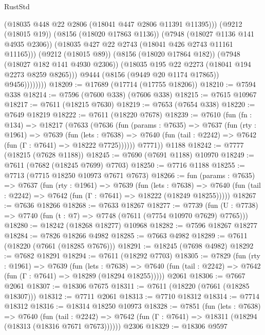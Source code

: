 \begin{lexlean}{RustStd}
\begin{coremodule}
                          (@18035 @448 @22 @2806 (@18041 @447 @2806 @11391 @11395)))
                        (@9212 (@18015 @19))
                        (@8156 (@18020 @17863 @1136))
                        (@7948 (@18027 @1136 @141 @4935 @2306))
                        (@18035 @427 @22 @2743 (@18041 @426 @2743 @11161 @11165)))
                      (@9212 (@18015 @89))
                      (@8156 (@18020 @17864 @182))
                      (@7948 (@18027 @182 @141 @4930 @2306))
                      (@18035 @195 @22 @2273 (@18041 @194 @2273 @8259 @8265)))
                    @9444
                    (@8156 (@9449 @20 @1174 @17865))
                    @9456))))))))
@18209 := @17689 (@17714 (@17755 @18206))
@18210 := @7594 @338
@18214 := @7596 (@7600 @338) (@7606 @338)
@18215 := @7615 @10967
@18217 := @7611 (@18215 @7630)
@18219 := @7653 (@7654 @338)
@18220 := @7649 @18219
@18222 := @7611 (@18220 @7678)
@18239 := @7610
    (fun (fn : @134) =>
    @18217
      (@7633
        (@7636
          (fun (params : @7635) =>
          @7637
            (fun (rty : @1961) =>
            @7639
              (fun (lets : @7638) =>
              @7640 (fun (tail : @2242) => @7642 (fun (Γ : @7641) => @18222 @7725))))))
        @7771))
    @1188
@18242 := @7777 (@18215 (@7628 @1188))
@18245 := @7690 (@7691 @1188) @10970
@18249 := @7611 (@7682 (@18245 @7699) @7703)
@18250 := @7716 @1188
@18255 := @7713 (@7715 @18250 @10973 @7671 @7673)
@18266 := fun (params : @7635) =>
  @7637
    (fun (rty : @1961) =>
    @7639
      (fun (lets : @7638) =>
      @7640 (fun (tail : @2242) => @7642 (fun (Γ : @7641) => @18222 (@18249 @18255)))))
@18267 := @7636 @18266
@18268 := @7633 @18267
@18277 := @7739
    (fun (U : @7738) => @7740 (fun (t : @7) => @7748 (@7611 (@7754 @10970 @7629) @7765)))
@18280 := @18242 (@18268 @18277) @10968
@18282 := @7596 @18267 @18277
@18284 := @7826 @18266 @4982
@18285 := @7663 @4982
@18289 := @7611 (@18220 (@7661 (@18285 @7676)))
@18291 := @18245 (@7698 @4982)
@18292 := @7682 @18291
@18294 := @7611 (@18292 @7703)
@18305 := @7829
    (fun (rty : @1961) =>
    @7639
      (fun (lets : @7638) =>
      @7640 (fun (tail : @2242) => @7642 (fun (Γ : @7641) => @18289 (@18294 @18255)))))
    @2061
@18306 := @7667 @2061
@18307 := @18306 @7675
@18311 := @7611 (@18220 (@7661 (@18285 @18307)))
@18312 := @7711 @2061
@18313 := @7710 @18312
@18314 := @7714 @18312
@18316 := @18314 @18250 @10973
@18328 := @7851
    (fun (lets : @7638) =>
    @7640
      (fun (tail : @2242) =>
      @7642 (fun (Γ : @7641) => @18311 (@18294 (@18313 (@18316 @7671 @7673))))))
    @2306
@18329 := @18306 @9597

\end{coremodule}
\end{lexlean}

